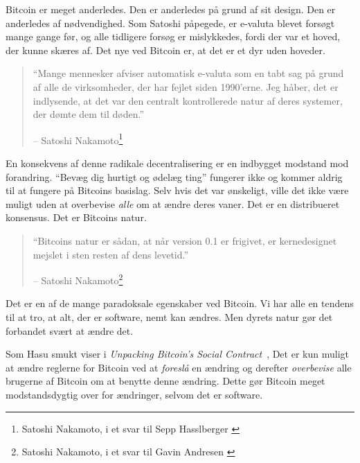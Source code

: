 \documentclass[paper=6in:9in,pagesize=pdftex,
               headinclude=on,footinclude=on,12pt]{scrbook}
\begin{document}
Bitcoin er meget anderledes. Den er anderledes på grund af sit design. Den er anderledes af nødvendighed. Som Satoshi påpegede, er e-valuta blevet forsøgt mange gange før, og alle tidligere forsøg er mislykkedes, fordi der var et hoved, der kunne skæres af. Det nye ved Bitcoin er, at det er et dyr uden hoveder.\begin{quotation}\begin{samepage} \enquote{Mange mennesker afviser automatisk e-valuta som en tabt sag på grund af alle de virksomheder, der har fejlet siden 1990'erne. Jeg håber, det er indlysende, at det var den centralt kontrollerede natur af deres systemer, der dømte dem til døden.} \begin{flushright} -- Satoshi Nakamoto\footnote{Satoshi Nakamoto, i et svar til Sepp Hasslberger \cite{satoshi-centralized-nature}}
\end{flushright}\end{samepage}\end{quotation}

En konsekvens af denne radikale decentralisering er en indbygget modstand mod forandring. \enquote{Bevæg dig hurtigt og ødelæg ting} fungerer ikke og kommer aldrig til at fungere på Bitcoins basislag. Selv hvis det var ønskeligt, ville det ikke være muligt uden at overbevise \textit{alle} om at ændre deres vaner. Det er en distribueret konsensus. Det er Bitcoins natur.\begin{quotation}\begin{samepage} \enquote{Bitcoins natur er sådan, at når version 0.1 er frigivet, er kernedesignet mejslet i sten resten af dens levetid.} \begin{flushright} -- Satoshi Nakamoto\footnote{Satoshi Nakamoto, i et svar til Gavin Andresen \cite{satoshi-centralized-nature}}
\end{flushright}\end{samepage}\end{quotation}

Det er en af de mange paradoksale egenskaber ved Bitcoin. Vi har alle en tendens til at tro, at alt, der er software, nemt kan ændres. Men dyrets natur gør det forbandet svært at ændre det.

Som Hasu smukt viser i \textit{Unpacking Bitcoin’s Social Contract}~\cite{social-contract}, Det er kun muligt at ændre reglerne for Bitcoin ved at \textit{foreslå} en ændring og derefter \textit{overbevise} alle brugerne af Bitcoin om at benytte denne ændring. Dette gør Bitcoin meget modstandsdygtig over for ændringer, selvom det er software.
\end{document}

